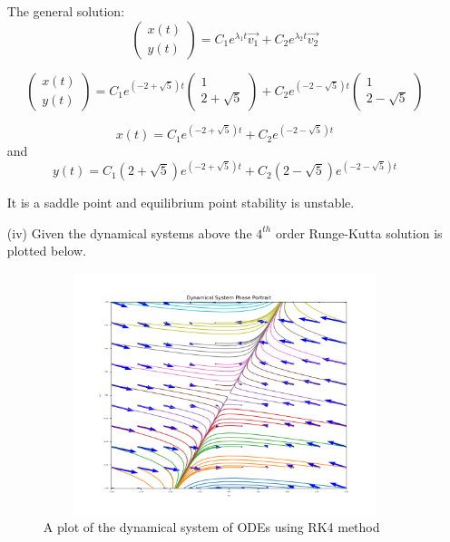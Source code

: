 \documentclass[12pt,a4paper]{article}
\begin{document}
\begin{enumerate}
The general solution:
\[
  \begin{pmatrix} x(t)\\ y(t) \end{pmatrix}
  =C_1e^{\lambda_1 t}\vec{v_1} + C_2 e^{\lambda_2 t}\vec{v_2}    
\]

\[
  \begin{pmatrix} x(t)\\ y(t) \end{pmatrix}
  =C_1e^{(-2 + \sqrt{5}) t}\begin{pmatrix} 1 \\ 2+\sqrt{5} \end{pmatrix}  + C_2 e^{(-2 - \sqrt{5}) t}\begin{pmatrix} 1 \\ 2 - \sqrt{5} \end{pmatrix}    
\]


\begin{equation}
x(t)= C_1e^{(-2 + \sqrt{5})t}  + C_2e^{(-2 - \sqrt{5})t}    \label{c9}
\end{equation}
and
\begin{equation}
y(t)= C_1(2 + \sqrt{5})e^{(-2 + \sqrt{5})t} + C_2(2 - \sqrt{5})e^{(-2 - \sqrt{5})t}    \label{c10}
\end{equation}




It is a saddle point and equilibrium point stability is unstable.
							\item[(iv)] Given the dynamical systems above the $4^{th}$ order Runge-Kutta solution is plotted below.

					\begin{figure}[!h]
									\includegraphics[width=430pt,  height=200pt]{./graphics/q002_a.png}
										\caption{A plot of the dynamical system of ODEs using RK4 method}
										\label{fig:q5}
								\end{figure}
\end{enumerate}
\end{document}
